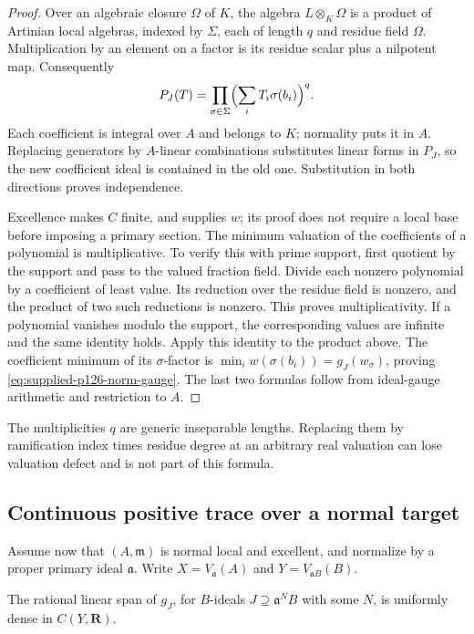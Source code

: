 \begin{proof}
Over an algebraic closure $\Omega$ of $K$, the algebra
$L\otimes_K\Omega$ is a product of Artinian local algebras, indexed by
$\Sigma$, each of length $q$ and residue field $\Omega$. Multiplication
by an element on a factor is its residue scalar plus a nilpotent map.
Consequently
\[
 P_J(T)=\prod_{\sigma\in\Sigma}
                  \Bigl(\sum_iT_i\sigma(b_i)\Bigr)^q.
\]
Each coefficient is integral over $A$ and belongs to $K$; normality puts
it in $A$. Replacing generators by $A$-linear combinations substitutes
linear forms in $P_J$, so the new coefficient ideal is contained in the
old one. Substitution in both directions proves independence.

Excellence makes $C$ finite, and
 supplies $w$; its proof does
not require a local base before imposing a primary section. The minimum
valuation of the coefficients of a polynomial is multiplicative. To
verify this with prime support, first quotient by the support and pass
to the valued fraction field. Divide each nonzero polynomial by a
coefficient of least value. Its reduction over the residue field is
nonzero, and the product of two such reductions is nonzero. This proves
multiplicativity. If a polynomial vanishes modulo the support, the
corresponding values are infinite and the same identity holds.
Apply this identity to the product above. The coefficient minimum of
its $\sigma$-factor is $\min_iw(\sigma(b_i))=g_J(w_\sigma)$, proving
\eqref{eq:supplied-p126-norm-gauge}. The last two formulas follow from
ideal-gauge arithmetic and restriction to $A$.
\end{proof}

The multiplicities $q$ are generic inseparable lengths. Replacing them
by ramification index times residue degree at an arbitrary real
valuation can lose valuation defect and is not part of this formula.

\subsection{Continuous positive trace over a normal target}

Assume now that $(A,\mathfrak m)$ is normal local and excellent, and
normalize by a proper primary ideal $\mathfrak a$. Write
$X=V_{\mathfrak a}(A)$ and $Y=V_{\mathfrak aB}(B)$.

\begin{lemma}\label{lem:supplied-p126-gauge-density}
The rational linear span of $g_J$, for $B$-ideals $J\supseteq\mathfrak a^N B$
with some $N$, is uniformly dense in $C(Y,\mathbf R)$.
\end{lemma}

